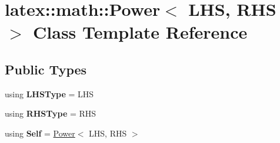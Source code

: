 \hypertarget{classlatex_1_1math_1_1Power}{\section{latex\-:\-:math\-:\-:Power$<$ L\-H\-S, R\-H\-S $>$ Class Template Reference}
\label{classlatex_1_1math_1_1Power}
}
\subsection*{Public Types}
\begin{DoxyCompactItemize}
\item 
\hypertarget{classlatex_1_1math_1_1Power_afc5f76bdef45b9e2b3aa3130b8d33c17}{using {\bfseries L\-H\-S\-Type} = L\-H\-S}\label{classlatex_1_1math_1_1Power_afc5f76bdef45b9e2b3aa3130b8d33c17}

\item 
\hypertarget{classlatex_1_1math_1_1Power_a94f6f0c782c19ed5011a931498207b7f}{using {\bfseries R\-H\-S\-Type} = R\-H\-S}\label{classlatex_1_1math_1_1Power_a94f6f0c782c19ed5011a931498207b7f}

\item 
\hypertarget{classlatex_1_1math_1_1Power_a912d185c7e29f193a9929af9bb214091}{using {\bfseries Self} = \hyperlink{classlatex_1_1math_1_1Power}{Power}$<$ L\-H\-S, R\-H\-S $>$}\label{classlatex_1_1math_1_1Power_a912d185c7e29f193a9929af9bb214091}

\end{DoxyCompactItemize}
